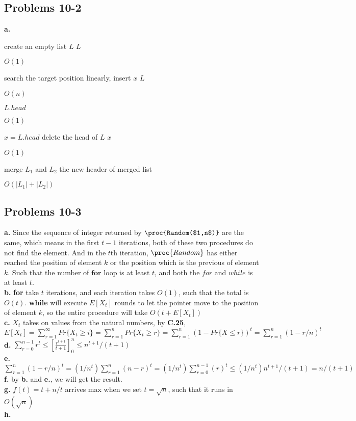 \documentclass[12pt]{article}
\theoremstyle{definition}
\theoremstyle{remark}
\begin{document}
\subsection*{Problems 10-2}
\textbf{a.}
\begin{codebox}
\li create an empty list $L$
\li \Return $L$
\end{codebox}
$O(1)$
\begin{codebox}
\li search the target position linearly, insert $x$
\li \Return $L$
\end{codebox}
$O(n)$
\begin{codebox}
\li \Return $L.head$
\end{codebox}
$O(1)$
\begin{codebox}
\li $x=L.head$
\li delete the head of $L$
\li \Return $x$
\end{codebox}
$O(1)$
\begin{codebox}
\li merge $L_1$ and $L_2$
\li \Return the new header of merged list
\end{codebox}
$O(|L_1|+|L_2|)$\\
\subsection*{Problems 10-3}
\textbf{a.} Since the sequence of integer returned by $\proc{Random($1,n$)}$ are the same, which means in the first $t-1$ iterations, both of these two procedures do not find the element. And in the $t$th iteration, $\proc{Random}$ has either reached the position of element $k$ or the position which is the previous of element $k$. Such that the number of $\textbf{for}$ loop is at least $t$, and both the $for$ and $while$ is at least $t$.\\
\textbf{b.} \textbf{for} take $t$ iterations, and each iteration takes $O(1)$, such that the total is $O(t)$. \textbf{while} will execute $E[X_t]$ rounds to let the pointer move to the position of element $k$, so the entire procedure will take $O(t+E[X_t])$\\
\textbf{c.} $X_t$ takes on values from the natural numbers, by \textbf{C.25}, $E[X_t]=\sum\limits_{r=1}^{\infty}Pr\{X_t\ge i\}=\sum\limits_{r=1}^{n}Pr\{X_t\ge r\}=\sum\limits_{r=1}^{n}(1-Pr\{X\le r\})^t=\sum\limits_{r=1}^{n}(1-r/n)^t$\\
\textbf{d.} $\sum\limits_{r=0}^{n-1}r^t\le[\frac{r^{t+1}}{t+1}]^{n}_0\le{n}^{t+1}/(t+1)$\\
\textbf{e.} $\sum\limits_{r=1}^{n}(1-r/n)^t=(1/n^t)\sum\limits_{r=1}^{n}(n-r)^t=(1/n^t)\sum\limits_{r=0}^{n-1}(r)^t\le(1/n^t){n}^{t+1}/(t+1)=n/(t+1)$\\
\textbf{f.} by \textbf{b.} and \textbf{e.}, we will get the result.\\
\textbf{g.} $f(t)=t+n/t$ arrives max when we set $t=\sqrt{n}$, such that it runs in $O(\sqrt{n})$\\
\textbf{h.}
\end{document}
